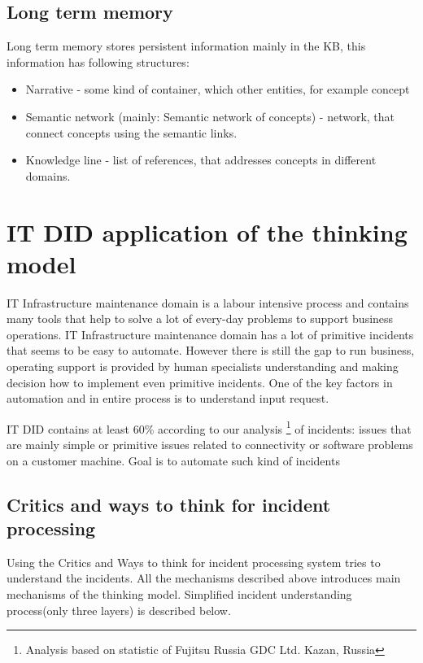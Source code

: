 \documentclass[conference]{IEEEtran}
\begin{document}
\subsection{Long term memory}
Long term memory stores persistent information mainly in the KB, this information has following structures:

\begin{itemize}
  \item Narrative - some kind of container, which other entities, for example concept
  \item Semantic network (mainly: Semantic network of concepts) - network, that connect concepts using the semantic links. 
  \item Knowledge line - list of references, that addresses concepts in different domains.
\end{itemize}

\section{IT DID application of the thinking model}

IT Infrastructure maintenance domain is a labour intensive process and contains many tools that help to solve a lot of every-day problems to support business operations. IT Infrastructure maintenance domain has a lot of primitive incidents that seems to be easy to automate. However there is still the gap to run business, operating support is provided by human specialists understanding and making decision how to implement even primitive incidents. One of the key factors in automation and in entire process is to understand input request.

IT DID contains at least 60\% according to our analysis \footnote{Analysis based on statistic of Fujitsu Russia GDC Ltd. Kazan, Russia } of incidents: issues that are mainly simple or primitive issues related to connectivity or software problems on a customer machine. Goal is to automate such kind of incidents

\subsection{Critics and ways to think for incident processing}
Using the Critics and Ways to think for incident processing system tries to understand the incidents.  
All the mechanisms described above introduces main mechanisms of the thinking model. Simplified incident understanding process(only three layers) is described below.
\end{document}

